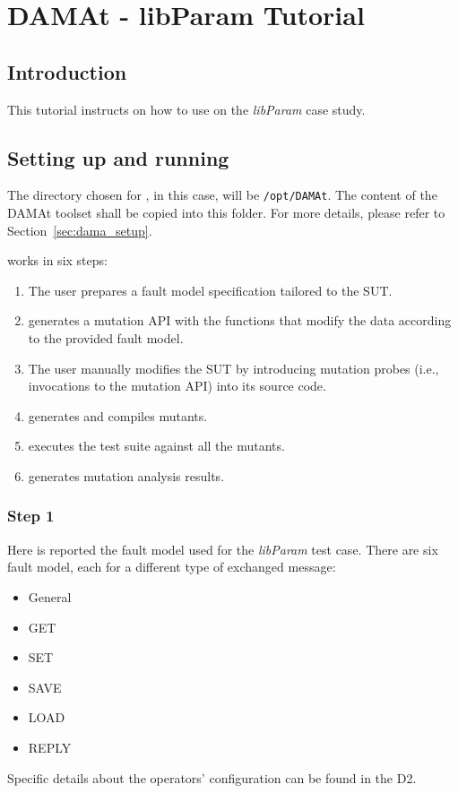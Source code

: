 
\chapter{DAMAt -  libParam Tutorial}

\label{chapter:dama:tutorial_param}

\section{Introduction}

This tutorial instructs on how to use \DAMA on the \emph{\emph{libParam}} case study.


\section{Setting up and running \DAMA}
\label{sec:param_single_machine}

The directory chosen for \DAMA, in this case, will be \texttt{/opt/DAMAt}.
The content of the DAMAt toolset shall be copied into this folder.
For more details, please refer to Section~\ref{sec:dama_setup}.

\DAMA works in six steps:

\begin{enumerate}
	\item The user prepares a fault model specification tailored to the SUT.
	\item \DAMA generates a mutation API with the functions that modify the data according to the provided fault model.
	\item The user manually modifies the SUT by introducing mutation probes (i.e., invocations to the mutation API) into its source code.
	\item \DAMA generates and compiles mutants.
	\item \DAMA executes the test suite against all the mutants.
	\item \DAMA generates mutation analysis results.
\end{enumerate}


\subsection{Step 1}

Here is reported the fault model used for the \emph{libParam} test case.
There are six fault model, each for a different type of exchanged message:
\begin{itemize}
  \item General
  \item GET
  \item SET
  \item SAVE
  \item LOAD
  \item REPLY
\end{itemize}
Specific details about the operators' configuration can be found in the D2.


